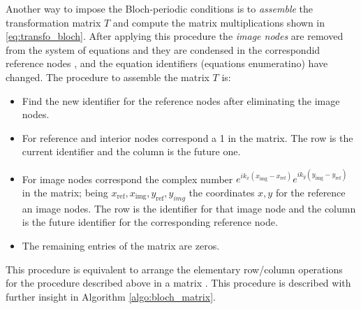 Another way to impose the Bloch-periodic conditions is to \emph{assemble} the transformation matrix $T$ and compute the matrix multiplications shown in \eqref{eq:transfo_bloch}. After applying this procedure the \emph{image nodes} are removed from the system of equations and they are condensed in the correspondid reference nodes \cite{langlet-thesis, hladky-hennion1992}, and the equation identifiers (equations enumeratino) have changed. The procedure to assemble the matrix $T$ is:
\begin{itemize}
\item Find the new identifier for the reference nodes after eliminating the image nodes.
\item For reference and interior nodes correspond a 1 in the matrix. The row is the current identifier and the column is the future one.
\item For image nodes correspond the complex number $e^{ik_x (x_\text{img}-x_\text{ref})}e^{ik_y (y_\text{img}-y_\text{ref})}$ in the matrix; being $x_\text{ref},x_\text{img},y_\text{ref},y_{img}$ the coordinates $x,y$ for the reference an image nodes. The row is the identifier for that image node and the column is the future identifier for the corresponding reference node.
\item The remaining entries of the matrix are zeros.
\end{itemize}
This procedure is equivalent to arrange the elementary row/column operations for the procedure described above in a matrix \cite{algebra_lineal-poole}. This procedure is described with further insight in Algorithm \ref{algo:bloch_matrix}.
